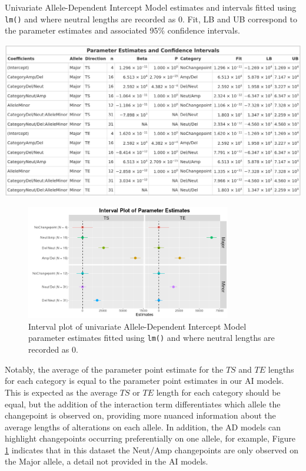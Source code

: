 \begin{table}[H]
\centering
\caption[Univariate Allele-Dependent Intercept Model parameter estimates and intervals fitted using \texttt{lm()}.]{Univariate Allele-Dependent Intercept Model estimates and intervals fitted using \texttt{lm()} and where neutral lengths are recorded as 0. Fit, LB and UB correspond to the parameter estimates and associated 95\% confidence intervals. }
      
\includegraphics[width = 1\textwidth]{../tables/Chapter_5/Univariate_lm_7_AD_Model_Pred.png}
\label{tab:lm_uni_AD_modpred}
\end{table}

\begin{figure}[H] 
\centering
\includegraphics[width = 0.8\textwidth]{../figures/Chapter_5/Univariate_lm_7_AD_Interval.png}
 
\caption[Interval plot of univariate Allele-Dependent Intercept Model parameter estimates fitted using \texttt{lm()}.]{Interval plot of univariate Allele-Dependent Intercept Model parameter estimates fitted using \texttt{lm()} and where neutral lengths are recorded as 0.}
\label{fig:lm_uni_AD_modpred}
\end{figure}

Notably, the average of the parameter point estimate for the $TS$ and $TE$ lengths for each category is equal to the parameter point estimates in our AI models. This is expected as the average $TS$ or $TE$ length for each category should be equal, but the addition of the interaction term differentiates which allele the changepoint is observed on, providing more nuanced information about the average lengths of alterations on each allele. In addition, the AD models can highlight changepoints occurring preferentially on one allele, for example, Figure \ref{fig:lm_uni_AD_modpred} indicates that in this dataset the Neut/Amp changepoints are only observed on the Major allele, a detail not provided in the AI models. 

